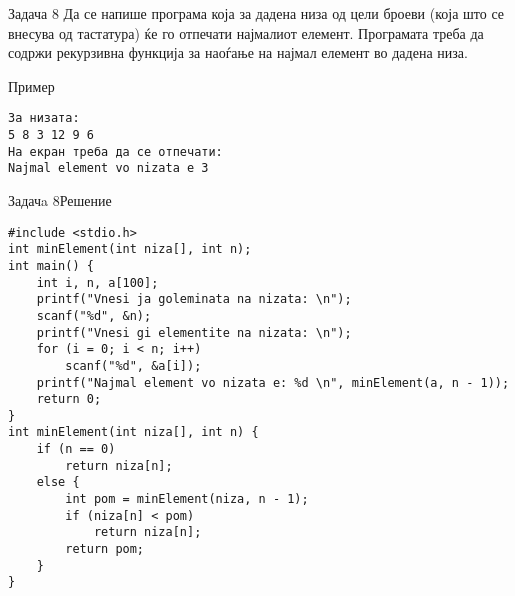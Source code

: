 \begin{frame}[fragile]{Задача 8}
Да се напише програма која за дадена низа од цели броеви (која што се
внесува од тастатура) ќе го отпечати најмалиот елемент. Програмата треба да
содржи рекурзивна функција за наоѓање на најмал елемент во дадена низа.
\begin{exampleblock}{Пример}
\begin{verbatim}
За низата:
5 8 3 12 9 6
На екран треба да се отпечати:
Najmal element vo nizata e 3
\end{verbatim}
\end{exampleblock}
\end{frame}

\begin{frame}[fragile]{Задачa 8}{Решение}
\begin{lstlisting}
#include <stdio.h>
int minElement(int niza[], int n);
int main() {
    int i, n, a[100];
    printf("Vnesi ja goleminata na nizata: \n");
    scanf("%d", &n);
    printf("Vnesi gi elementite na nizata: \n");
    for (i = 0; i < n; i++)
        scanf("%d", &a[i]);
    printf("Najmal element vo nizata e: %d \n", minElement(a, n - 1));
    return 0;
}
int minElement(int niza[], int n) {
    if (n == 0)
        return niza[n];
    else {
        int pom = minElement(niza, n - 1);
        if (niza[n] < pom)
            return niza[n];
        return pom;
    }
}
\end{lstlisting}
\end{frame}

